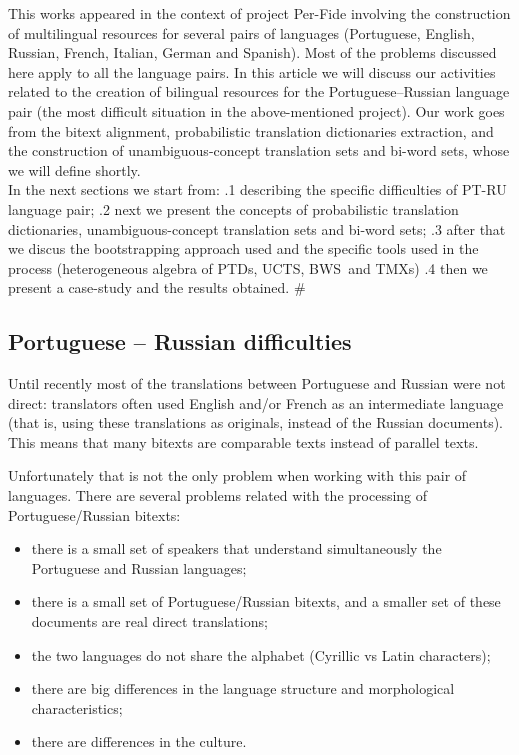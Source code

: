 \documentclass[a4paper,russian,UKenglish]{oasics}
\def\UC{unambiguous-concept}
\def\UCTS{\UC{} translation sets}
\def\UCTSS{{\sc UCTS}}
\def\PTD{probabilistic translation dictionaries}
\def\PTDS{{\sc PTDs}}
\def\BWS{bi-word sets}
\def\BWSS{{\sc BWS}}
\def\TMXS{{\sc TMXs}}
\begin{document}
This works appeared in the context of project Per-Fide involving the
construction of multilingual resources for several pairs of languages
(Portuguese, English, Russian, French, Italian, German and Spanish).
Most of the problems discussed here apply to all the language
pairs. 
In this article we will discuss our activities related to the creation
of bilingual resources for the Portuguese--Russian language pair (the most
difficult situation in the above-mentioned project). Our
work goes from the bitext alignment, \PTD{} extraction, and the
construction of \UCTS{} and \BWS, whose we will define shortly.\\

In the next sections we start from:
 .1 describing the specific difficulties of PT-RU language pair;
 .2 next we present the concepts of \PTD{}, \UCTS{} and \BWS;
 .3 after that we discus the bootstrapping approach used and the specific 
  tools used in the process (heterogeneous algebra of \PTDS, \UCTSS, \BWSS\ and \TMXS)
 .4 then we present a case-study and the results obtained.
#


\subsection{Portuguese -- Russian difficulties}

Until recently most of the translations between Portuguese and Russian
were not direct: translators often used English and/or French as an
intermediate language (that is, using these translations as originals,
instead of the Russian documents). This means that many bitexts are
comparable texts instead of parallel texts.

Unfortunately that is not the only problem when working with this pair
of languages. There are several problems related with the processing
of Portuguese/Russian bitexts:
\begin{itemize}
\item there is a small set of speakers that understand simultaneously
  the Portuguese and Russian languages;
\item there is a small set of Portuguese/Russian bitexts, and a
  smaller set of these documents are real direct translations;
\item the two languages do not share the alphabet (Cyrillic vs Latin
  characters);
\item there are big differences in the language structure and
  morphological characteristics;
\item there are differences in the culture.
\end{itemize}
\end{document}

